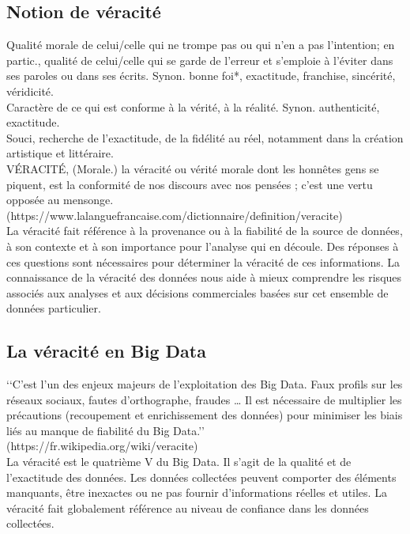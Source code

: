 \documentclass[12pt]{report}
\begin{document}
\subsection{Notion de véracité}

Qualité morale de celui/celle qui ne trompe pas ou qui n'en a pas l'intention; en partic., qualité de celui/celle qui se garde de l'erreur et s'emploie à l'éviter dans ses paroles ou dans ses écrits. Synon. bonne foi*, exactitude, franchise, sincérité, véridicité.\\
Caractère de ce qui est conforme à la vérité, à la réalité. Synon. authenticité, exactitude.\\
Souci, recherche de l'exactitude, de la fidélité au réel, notamment dans la création artistique et littéraire.\\
VÉRACITÉ, (Morale.) la véracité ou vérité morale dont les honnêtes gens se piquent, est la conformité de nos discours avec nos pensées ; c’est une vertu opposée au mensonge.
\\(https://www.lalanguefrancaise.com/dictionnaire/definition/veracite)\\

La véracité fait référence à la provenance ou à la fiabilité de la source de données, à son contexte et à son importance pour l'analyse qui en découle. Des réponses à ces questions sont nécessaires pour déterminer la véracité de ces informations. La connaissance de la véracité des données nous aide à mieux comprendre les risques associés aux analyses et aux décisions commerciales basées sur cet ensemble de données particulier.

\subsection{La véracité en Big Data}

‘‘C'est l'un des enjeux majeurs de l'exploitation des Big Data. Faux profils
sur les réseaux sociaux, fautes d'orthographe, fraudes … Il est nécessaire
de multiplier les précautions (recoupement et enrichissement des données)
pour minimiser les biais liés au manque de fiabilité du Big Data.’’
\\(https://fr.wikipedia.org/wiki/veracite)\\

La véracité est le quatrième V du Big Data. Il s’agit de la qualité et de l’exactitude des données. Les données collectées peuvent comporter des éléments manquants, être inexactes ou ne pas fournir d’informations réelles et utiles. La véracité fait globalement référence au niveau de confiance dans les données collectées.
\end{document}

